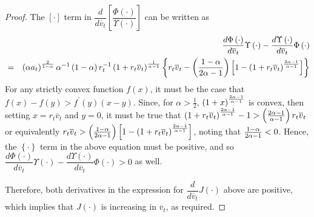 \documentclass{article}
\begin{document}
\begin{proof}
The $\left[ \cdot \right]$ term in $\dfrac{d}{d\overline{v}_{t}}\left[
\dfrac{\Phi \left( \cdot \right) }{\Upsilon \left( \cdot \right) }\right]$
can be written as
\begin{eqnarray*}
&&\frac{d\Phi \left( \cdot \right) }{d\overline{v}_{t}}\Upsilon \left( \cdot
\right) -\frac{d\Upsilon \left( \cdot \right) }{d\overline{v}_{t}}\Phi
\left( \cdot \right) \\
&=&\left( \alpha a_{t}\right) ^{\frac{2}{1-\alpha }}\alpha ^{-1}\left(
1-\alpha \right) r_{t}^{-1}\left( 1+r_{t}\overline{v}_{t}\right) ^{\frac{1}{%
\alpha -1}}\left\{ r_{t}\overline{v}_{t}-\left( \frac{1-\alpha }{2\alpha -1}%
\right) \left[ 1-\left( 1+r_{t}\overline{v}_{t}\right) ^{\frac{2\alpha -1}{%
\alpha -1}}\right] \right\}
\end{eqnarray*}
For any strictly convex function $f\left( x\right)$, it must be the case
that $f\left( x\right) -f\left( y\right) >f^{\prime }\left( y\right) \left(
x-y\right)$. Since, for $\alpha >\frac{1}{2}$, $\left( 1+x\right) ^{\frac{%
2\alpha -1}{\alpha -1}}$ is convex, then setting $x=r_{t}\overline{v}_{t}$
and $y=0$, it must be true that $\left( 1+r_{t}\overline{v}_{t}\right) ^{%
\frac{2\alpha -1}{\alpha -1}}-1>\left( \frac{2\alpha -1}{\alpha -1}\right)
r_{t}\overline{v}_{t}$ or equivalently $r_{t}\overline{v}_{t}>\left( \frac{%
1-\alpha }{2\alpha -1}\right) \left[ 1-\left( 1+r_{t}\overline{v}_{t}\right)
^{\frac{2\alpha -1}{\alpha -1}}\right]$, noting that $\frac{1-\alpha }{%
2\alpha -1}<0$. Hence, the $\left\{ \cdot \right\}$ term in the above
equation must be positive, and so $\dfrac{d\Phi \left( \cdot \right) }{d%
\overline{v}_{t}}\Upsilon \left( \cdot \right) -\dfrac{d\Upsilon \left(
\cdot \right) }{d\overline{v}_{t}}\Phi \left( \cdot \right) >0$ as well.

Therefore, both derivatives in the expression for $\dfrac{d}{d\overline{v}%
_{t}}J\left( \cdot \right)$ above are positive, which implies that $J\left(
\cdot \right)$ is increasing in $\overline{v}_{t}$, as required.
\end{proof}

\bigskip

\pagebreak
\end{document}
